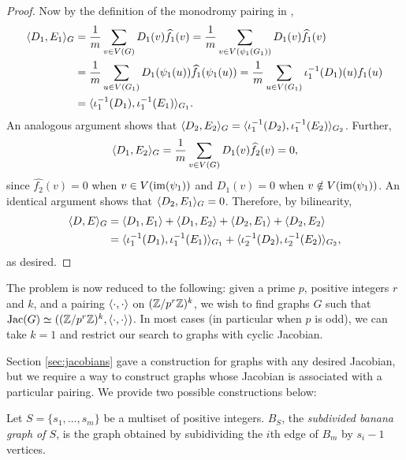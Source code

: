 \documentclass{amsart}
\begin{document}
\begin{proof}
  Now by the definition of the monodromy pairing in \cite{Shokrieh2010},
  \begin{align*}
    \langle D_1, E_1 \rangle_G &= \frac{1}{m} \sum_{v \in V(G)} D_1(v) \widehat{f_1}(v) = \frac{1}{m} \sum_{v \in V(\psi_1(G_1))} D_1(v) \widehat{f_1}(v) \\
    &= \frac{1}{m} \sum_{u \in V(G_1)} D_1(\psi_1(u)) \widehat{f_1}(\psi_1(u)) = \frac{1}{m} \sum_{u\in V(G_1)} \iota_1^{-1}(D_1)(u)f_1(u) \\
    &= \langle \iota_1^{-1}(D_1), \iota_1^{-1}(E_1) \rangle_{G_1}.
  \end{align*}
  An analogous argument shows that $\langle D_2, E_2 \rangle_G =
  \langle \iota_1^{-1}(D_2), \iota_1^{-1}(E_2) \rangle_{G_2}$. Further,
  \[
  \langle D_1, E_2 \rangle_G = \frac{1}{m} \sum_{v \in V(G)} D_1(v)
  \widehat{f_2}(v) = 0,
  \]
  since $\widehat{f_2}(v)=0$ when $v\in V(\operatorname{im}(\psi_1))$ and $D_1(v)=0$
  when $v\notin V(\operatorname{im}(\psi_1))$. An identical argument shows that
  $\langle D_2, E_1 \rangle_G = 0$. Therefore, by bilinearity,
  \begin{align*}
    \langle D, E \rangle_G &= \langle D_1, E_1 \rangle + \langle D_1, E_2 \rangle + \langle D_2, E_1 \rangle + \langle D_2, E_2 \rangle \\
    &= \langle \iota_1^{-1}(D_1), \iota_1^{-1}(E_1) \rangle_{G_1} + \langle \iota_2^{-1}(D_2), \iota_2^{-1}(E_2) \rangle_{G_2},
  \end{align*}
  as desired.
\end{proof}


The problem is now reduced to the following: given a prime $p$,
positive integers $r$ and $k$, and a pairing $\langle \cdot, \cdot \rangle$ on
$(\mathbb{Z}/p^r\mathbb{Z})^k$, we wish to find graphs $G$ such that $\operatorname{Jac}(G) \simeq
((\mathbb{Z}/p^r\mathbb{Z})^k, \langle \cdot, \cdot \rangle)$. In most cases (in particular
when $p$ is odd), we can take $k=1$ and restrict our search to graphs
with cyclic Jacobian.

Section \ref{sec:jacobians} gave a construction for graphs with any
desired Jacobian, but we require a way to construct graphs whose
Jacobian is associated with a particular pairing. We provide two
possible constructions below:

\begin{defn}
  Let $S = \{s_1, \ldots, s_m\}$ be a multiset of positive
  integers. $B_S$, the \emph{subdivided banana graph of $S$}, is the
  graph obtained by subidividing the $i$th edge of $B_m$ by $s_i-1$
  vertices.
\end{defn}
\end{document}
